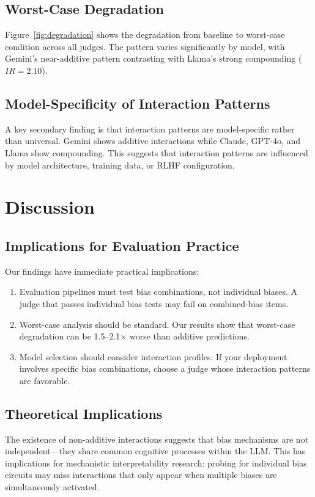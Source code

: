 \documentclass[11pt,twocolumn]{article}
\begin{document}
\subsection{Worst-Case Degradation}
Figure~\ref{fig:degradation} shows the degradation from baseline to worst-case condition across all judges. The pattern varies significantly by model, with Gemini's near-additive pattern contrasting with Llama's strong compounding ($IR = 2.10$).

\subsection{Model-Specificity of Interaction Patterns}
A key secondary finding is that interaction patterns are model-specific rather than universal. Gemini shows additive interactions while Claude, GPT-4o, and Llama show compounding. This suggests that interaction patterns are influenced by model architecture, training data, or RLHF configuration.

\section{Discussion}
\label{sec:discussion}

\subsection{Implications for Evaluation Practice}
Our findings have immediate practical implications:
\begin{enumerate}
    \item Evaluation pipelines must test bias combinations, not individual biases. A judge that passes individual bias tests may fail on combined-bias items.
    \item Worst-case analysis should be standard. Our results show that worst-case degradation can be 1.5--2.1$\times$ worse than additive predictions.
    \item Model selection should consider interaction profiles. If your deployment involves specific bias combinations, choose a judge whose interaction patterns are favorable.
\end{enumerate}

\subsection{Theoretical Implications}
The existence of non-additive interactions suggests that bias mechanisms are not independent---they share common cognitive processes within the LLM. This has implications for mechanistic interpretability research: probing for individual bias circuits may miss interactions that only appear when multiple biases are simultaneously activated.
\end{document}
